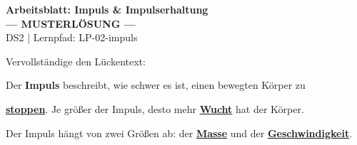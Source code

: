\documentclass[11pt,a4paper]{article}
\newcommand{\lsg}[1]{\textcolor{loesung}{\underline{\textbf{#1}}}}
\begin{document}

\begin{center}
    {\Large\bfseries\textcolor{physik}{Arbeitsblatt: Impuls \& Impulserhaltung}}\\[3pt]
    {\large\textcolor{loesung}{\textbf{— MUSTERLÖSUNG —}}}\\[5pt]
    {\small DS2 | Lernpfad: LP-02-impuls}
\end{center}

\vspace{5mm}


\begin{kasten}

Vervollständige den Lückentext:

\vspace{8pt}

Der \textbf{Impuls} beschreibt, wie schwer es ist, einen bewegten Körper zu

\lsg{stoppen}. Je größer der Impuls, desto mehr \glqq\lsg{Wucht}\grqq{} hat der Körper.

\vspace{8pt}

Der Impuls hängt von zwei Größen ab: der \lsg{Masse} und der \lsg{Geschwindigkeit}.

\end{kasten}

\vspace{5mm}

\end{document}
